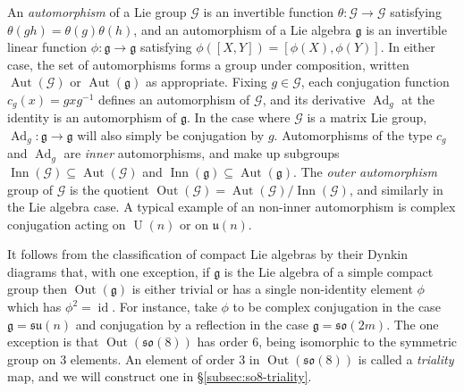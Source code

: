 \documentclass[reqno]{amsart}
\theoremstyle{definition} \newtheorem{example}[theorem]{Example}
\newcommand{\U}{\operatorname{U}}
\newcommand{\so}{\mathfrak{so}}
\newcommand{\su}{\mathfrak{su}}
\DeclareMathOperator{\Ad}{Ad}
\DeclareMathOperator{\id}{id}
\DeclareMathOperator{\Aut}{Aut}
\DeclareMathOperator{\Out}{Out}
\DeclareMathOperator{\Inn}{Inn}
\newcommand{\secsymbol}{§}
\newcommand{\G}{\mathcal{G}}
\newcommand{\g}{\mathfrak{g}}
\begin{document}
An \emph{automorphism} of a Lie group $\G$ is an invertible function $\theta : \G \to \G$ satisfying $\theta(gh) = \theta(g)\theta(h)$, and an automorphism of a Lie algebra $\g$ is an invertible linear function $\phi : \g \to \g$ satisfying $\phi([X,Y]) = [\phi(X),\phi(Y)]$. In either case, the set of automorphisms forms a group under composition, written $\Aut(\G)$ or $\Aut(\g)$ as appropriate. Fixing $g \in \G$, each conjugation function $c_g(x) = gxg^{-1}$ defines an automorphism of $\G$, and its derivative $\Ad_g$ at the identity is an automorphism of $\g$. In the case where $\G$ is a matrix Lie group, $\Ad_g : \g \to \g$ will also simply be conjugation by $g$. Automorphisms of the type $c_g$ and $\Ad_g$ are \emph{inner} automorphisms, and make up subgroups $\Inn(\G) \subseteq \Aut(\G)$ and $\Inn(\g) \subseteq \Aut(\g)$. The \emph{outer automorphism} group of $\G$ is the quotient $\Out(\G) = \Aut(\G)/\Inn(\G)$, and similarly in the Lie algebra case. A typical example of an non-inner automorphism is complex conjugation acting on $\U(n)$ or on $\mathfrak{u}(n)$. 

It follows from the classification of compact Lie algebras by their Dynkin diagrams that, with one exception, if $\g$ is the Lie algebra of a simple compact group then $\Out(\g)$ is either trivial or has a single non-identity element $\phi$ which has $\phi^2 = \id$.  For instance, take $\phi$ to be complex conjugation in the case $\g = \su(n)$ and conjugation by a reflection in the case $\g = \so(2m)$. The one exception is that $\Out(\so(8))$ has order 6, being isomorphic to the symmetric group on 3 elements. An element of order 3 in $\Out(\so(8))$ is called a \emph{triality} map, and we will construct one in \secsymbol\ref{subsec:so8-triality}.
\end{document}
